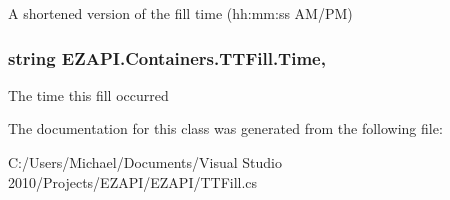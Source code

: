 A shortened version of the fill time (hh\-:mm\-:ss A\-M/\-P\-M) 

\hypertarget{class_e_z_a_p_i_1_1_containers_1_1_t_t_fill_a15a9a18da888458ffc2780124287accd}{
\subsubsection[{Time}]{\setlength{\rightskip}{0pt plus 5cm}string E\-Z\-A\-P\-I.\-Containers.\-T\-T\-Fill.\-Time\hspace{0.3cm}{\ttfamily [get]}, {\ttfamily [set]}}}\label{class_e_z_a_p_i_1_1_containers_1_1_t_t_fill_a15a9a18da888458ffc2780124287accd}


The time this fill occurred 



The documentation for this class was generated from the following file\-:\begin{DoxyCompactItemize}
\item 
C\-:/\-Users/\-Michael/\-Documents/\-Visual Studio 2010/\-Projects/\-E\-Z\-A\-P\-I/\-E\-Z\-A\-P\-I/T\-T\-Fill.\-cs\end{DoxyCompactItemize}

